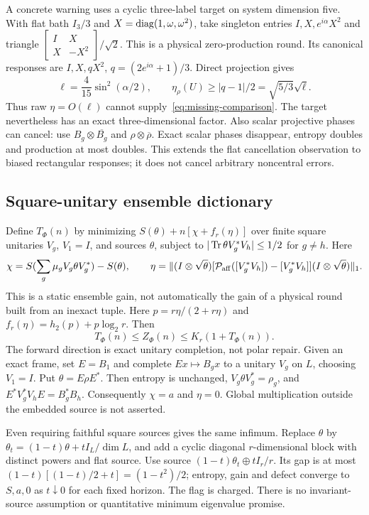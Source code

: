 A concrete warning uses a cyclic three-label target on system dimension
five. With flat bath $I_3/3$ and $X=\operatorname{diag}(1,\omega,\omega^2)$,
take singleton entries $I,X,e^{i\alpha}X^2$ and triangle
$\left[\begin{smallmatrix}I&X\\X&-X^2\end{smallmatrix}\right]/\sqrt2$.
This is a physical zero-production round. Its canonical responses are
$I,X,qX^2$, $q=(2e^{i\alpha}+1)/3$. Direct projection gives
\[
 \ell=\frac4{15}\sin^2(\alpha/2),\qquad
 \eta_\rho(U)\geq|q-1|/2=\sqrt{5/3}\sqrt\ell.
\]
Thus raw $\eta=O(\ell)$ cannot supply~\eqref{eq:missing-comparison}.
The target nevertheless has an exact three-dimensional factor.
Also scalar projective phases can cancel: use
$B_g\otimes\overline{B_g}$ and $\rho\otimes\overline\rho$.
Exact scalar phases disappear, entropy doubles and production at most
doubles. This extends the flat cancellation observation to biased
rectangular responses; it does not cancel arbitrary noncentral errors.

\subsection{Square-unitary ensemble dictionary}
Define $T_\Phi(n)$ by minimizing
$S(\theta)+n[\chi+f_r(\eta)]$ over finite square unitaries $V_g$, $V_1=I$,
and sources $\theta$, subject to
$|\operatorname{Tr}\theta V_g^*V_h|\leq1/2$ for $g\ne h$. Here
\[
 \chi=S(\sum_g\mu_gV_g\theta V_g^*)-S(\theta),\qquad
 \eta=\|(I\otimes\sqrt\theta)
 [\mathcal P_{\rm aff}([V_g^*V_h])-[V_g^*V_h]]
 (I\otimes\sqrt\theta)\|_1.
\]
This is a static ensemble gain, not automatically the gain of a
physical round built from an inexact tuple. Here
$p=r\eta/(2+r\eta)$ and $f_r(\eta)=h_2(p)+p\log_2r$.
Then
\begin{equation}\label{eq:W-dictionary}
 T_\Phi(n)\leq Z_\Phi(n)\leq K_r(1+T_\Phi(n)).
\end{equation}
The forward direction is exact unitary completion, not polar repair.
Given an exact frame, set $E=B_1$ and complete $Ex\mapsto B_gx$
to a unitary $V_g$ on $L$, choosing $V_1=I$. Put $\theta=E\rho E^*$.
Then entropy is unchanged, $V_g\theta V_g^*=\rho_g$, and
$E^*V_g^*V_hE=B_g^*B_h$. Consequently $\chi=a$ and $\eta=0$.
Global multiplication outside the embedded source is not asserted.

Even requiring faithful square sources gives the same infimum.
Replace $\theta$ by $\theta_t=(1-t)\theta+tI_L/\dim L$, and add
a cyclic diagonal $r$-dimensional block with distinct powers and flat
source. Use source $(1-t)\theta_t\oplus tI_r/r$.
Its gap is at most $(1-t)[(1-t)/2+t]=(1-t^2)/2$;
entropy, gain and defect converge to $S,a,0$ as $t\downarrow0$ for
each fixed horizon. The flag is charged. There is no invariant-source
assumption or quantitative minimum eigenvalue promise.

